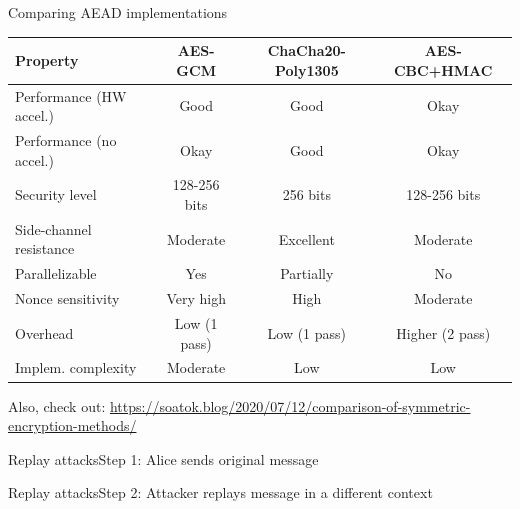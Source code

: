 \ifdefined\PRESENTATION\else\PassOptionsToClass{handout}{beamer}\fi\documentclass[aspectratio=169, lualatex]{beamer}
\begin{document}
\begin{frame}{Comparing AEAD implementations}
	\begin{center}
		\begin{tabular}{|l|c|c|c|}
			\hline
			\textbf{Property}       & \textbf{AES-GCM} & \textbf{ChaCha20-Poly1305} & \textbf{AES-CBC+HMAC} \\
			\hline
			Performance (HW accel.) & Good             & Good                       & Okay                  \\
			\hline
			Performance (no accel.) & Okay             & Good                       & Okay                  \\
			\hline
			Security level          & 128-256 bits     & 256 bits                   & 128-256 bits          \\
			\hline
			Side-channel resistance & Moderate         & Excellent                  & Moderate              \\
			\hline
			Parallelizable          & Yes              & Partially                  & No                    \\
			\hline
			Nonce sensitivity       & Very high        & High                       & Moderate              \\
			\hline
			Overhead                & Low (1 pass)     & Low (1 pass)               & Higher (2 pass)       \\
			\hline
			Implem. complexity      & Moderate         & Low                        & Low                   \\
			\hline
		\end{tabular}
	\end{center}
	Also, check out: \url{https://soatok.blog/2020/07/12/comparison-of-symmetric-encryption-methods/}
\end{frame}

\begin{frame}{Replay attacks}{Step 1: Alice sends original message}
\end{frame}

\begin{frame}{Replay attacks}{Step 2: Attacker replays message in a different context}
\end{frame}
\end{document}

